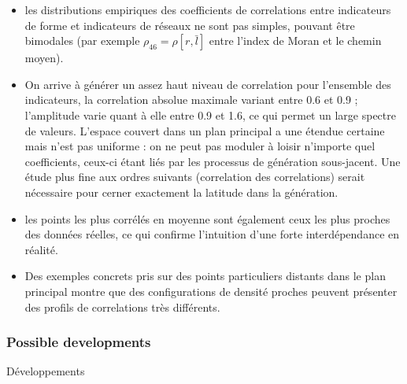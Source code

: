{\begin{itemize}
\item les distributions empiriques des coefficients de correlations entre indicateurs de forme et indicateurs de réseaux ne sont pas simples, pouvant être bimodales (par exemple $\rho_{46}=\rho[r,\bar{l}]$ entre l'index de Moran et le chemin moyen).
\item On arrive à générer un assez haut niveau de correlation pour l'ensemble des indicateurs, la correlation absolue maximale variant entre 0.6 et 0.9 ; l'amplitude varie quant à elle entre 0.9 et 1.6, ce qui permet un large spectre de valeurs. L'espace couvert dans un plan principal a une étendue certaine mais n'est pas uniforme : on ne peut pas moduler à loisir n'importe quel coefficients, ceux-ci étant liés par les processus de génération sous-jacent. Une étude plus fine aux ordres suivants (correlation des correlations) serait nécessaire pour cerner exactement la latitude dans la génération.
\item les points les plus corrélés en moyenne sont également ceux les plus proches des données réelles, ce qui confirme l'intuition d'une forte interdépendance en réalité.
\item Des exemples concrets pris sur des points particuliers distants dans le plan principal montre que des configurations de densité proches peuvent présenter des profils de correlations très différents.
\end{itemize}
}







\subsubsection{Possible developments}{Développements}


